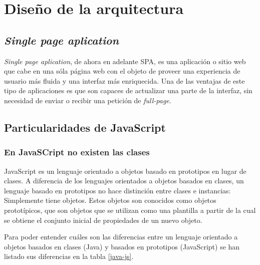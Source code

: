 \section{Diseño de la arquitectura}

\subsection{	\textit{Single page aplication}}
\textit{Single page aplication}, de ahora en adelante SPA, es una aplicación o sitio web que cabe en una sóla página web con el objeto de proveer una experiencia de usuario más fluida y una interfaz más enriquecida. Una de las ventajas de este tipo de aplicaciones es que son capaces de actualizar una parte de la interfaz, sin necesidad de enviar o recibir una petición de \textit{full-page}\cite{fernandomonteiro2014}.


\subsection{Particularidades de JavaScript}
\subsubsection{En JavaSCript no existen las clases}
JavaScript es un lenguaje orientado a objetos basado en prototipos en lugar de clases. A diferencia de los lenguajes orientados a objetos basados en clases, un lenguaje basado en prototipos no hace distinción entre clases e instancias: Simplemente tiene objetos. Estos objetos son conocidos como objetos prototípicos, que son objetos que se utilizan como una plantilla a partir de la cual se obtiene el conjunto inicial de propiedades de un nuevo objeto\cite{fernandomonteiro2014}.


Para poder entender cuáles son las diferencias entre un lenguaje orientado a objetos basados en clases (Java) y basados en prototipos (JavaScript) se han listado sus diferencias en la tabla \ref{java-js}.


